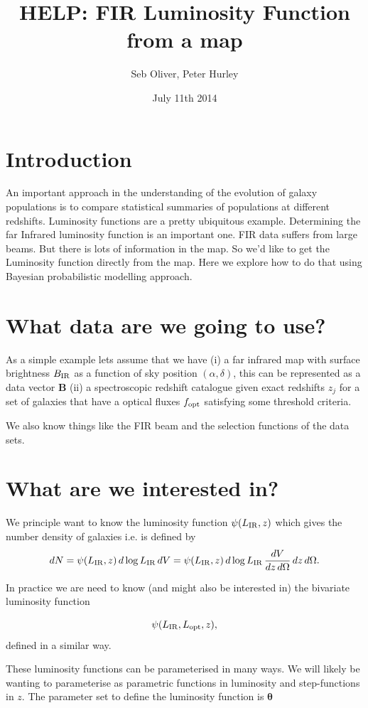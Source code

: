 \documentclass[a4paper,11pt]{article}
\author{Seb Oliver, Peter Hurley}
\title{HELP: FIR Luminosity Function from a map}
\date{July 11th 2014}
\begin{document}
\maketitle

\tableofcontents


\section{Introduction}
An important approach in the understanding of the evolution of galaxy populations is to compare statistical summaries of populations at different redshifts.    Luminosity functions are a pretty ubiquitous example.
Determining the far Infrared luminosity function is an important one.  FIR data suffers from large beams.  But there is lots of information in the map.  So we'd like to get the Luminosity function directly from the map.  Here we explore how to do that using Bayesian probabilistic modelling approach.

\section{What data are we going to use?} 
As a simple example lets assume that we have (i) a far infrared map with surface brightness $B_{\rm IR}$ as a function of sky position $(\alpha, \delta)$, this can be represented as a data vector $\mathbf{B}$  (ii) a spectroscopic redshift catalogue given exact redshifts $z_j$ for a set of galaxies that have a optical fluxes $f_{\rm opt}$ satisfying some threshold criteria.   

We also know things like the FIR beam and the selection functions of the data sets.

\section{What are we interested in?}
We principle want to know the luminosity function $\psi(L_{\rm IR},z)$ which gives the number density of galaxies i.e. is defined by 
$$dN=\psi( L_{\rm IR},z)\,d\log L_{\rm IR}\,dV=\psi( L_{\rm IR},z)\,d\log L_{\rm IR}\,\frac{dV}{dz\,d\Omega}\,dz\,d\Omega.$$

In practice we are need to know (and might also be interested in) the bivariate luminosity function

$$\psi( L_{\rm IR},L_{\rm opt},z),$$
defined in a similar way.

These luminosity functions can be parameterised in many ways.  We will likely be wanting to parameterise as parametric functions in luminosity and step-functions in $z$.  The parameter set to define the luminosity function is $\bm{\theta}$
\end{document}
